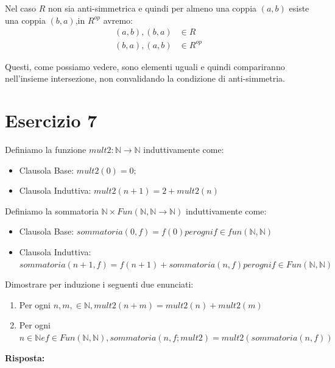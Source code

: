 \documentclass[a4paper,12pt]{article}
\begin{document}
Nel caso $R$ non sia anti-simmetrica e quindi per almeno una coppia $(a,b)$ esiste una coppia $(b,a)$,in $R^{op}$ avremo:
\[
\begin{aligned}
(a,b),(b,a) &\in R\\
(b,a),(a,b) &\in R^{op}
\end{aligned}
\]

Questi, come possiamo vedere, sono elementi uguali e quindi compariranno nell'insieme intersezione, non convalidando la condizione di anti-simmetria.

\section{Esercizio 7}

Definiamo la funzione $mult2: \mathbb{N} \rightarrow \mathbb{N}$ induttivamente come:
\begin{itemize}
    \item Clausola Base: $mult2(0) = 0;$
    \item Clausola Induttiva: $mult2(n+1) = 2+mult2(n)$\\
\end{itemize}

Definiamo la sommatoria $\mathbb{N} \times Fun(\mathbb{N},\mathbb{N} \rightarrow \mathbb{N})$ induttivamente come:
\begin{itemize}
    \item Clausola Base: $sommatoria(0,f) = f(0) per ogni f \in fun(\mathbb{N},\mathbb{N})$
    \item Clausola Induttiva: $sommatoria(n+1,f) = f(n+1) + sommatoria(n,f) per ogni f \in Fun(\mathbb{N},\mathbb{N})$\\
\end{itemize}


Dimostrare per induzione i seguenti due enunciati:
\begin{enumerate}
    \item Per ogni $n,m, \in \mathbb{N}, mult2(n+m) = mult2(n) + mult2(m)$
    \item Per ogni $n \in \mathbb{N} e f \in Fun(\mathbb{N},\mathbb{N}), sommatoria (n,f;mult2) = mult2(sommatoria(n,f))$
\end{enumerate}
 
\textbf{Risposta:}
\end{document}
